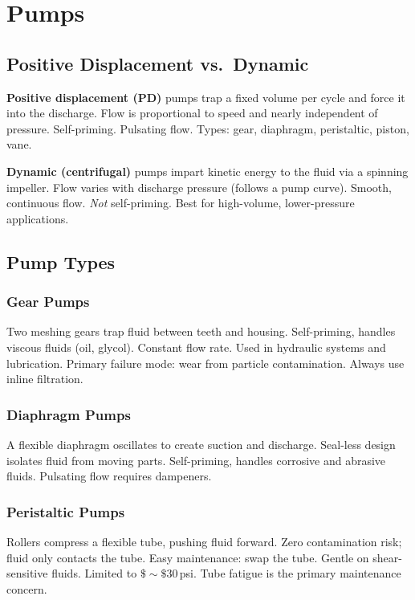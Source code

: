 \documentclass[11pt,letterpaper,twoside,openany]{book}
\begin{document}
\section{Pumps}

\subsection{Positive Displacement vs.\ Dynamic}

\textbf{Positive displacement (PD)} pumps trap a fixed volume per cycle and force it into the discharge. Flow is proportional to speed and nearly independent of pressure. Self-priming. Pulsating flow. Types: gear, diaphragm, peristaltic, piston, vane.

\textbf{Dynamic (centrifugal)} pumps impart kinetic energy to the fluid via a spinning impeller. Flow varies with discharge pressure (follows a pump curve). Smooth, continuous flow. \emph{Not} self-priming. Best for high-volume, lower-pressure applications.

\subsection{Pump Types}

\subsubsection{Gear Pumps}
Two meshing gears trap fluid between teeth and housing. Self-priming, handles viscous fluids (oil, glycol). Constant flow rate. Used in hydraulic systems and lubrication. Primary failure mode: wear from particle contamination. Always use inline filtration.

\subsubsection{Diaphragm Pumps}
A flexible diaphragm oscillates to create suction and discharge. Seal-less design isolates fluid from moving parts. Self-priming, handles corrosive and abrasive fluids. Pulsating flow requires dampeners.

\subsubsection{Peristaltic Pumps}
Rollers compress a flexible tube, pushing fluid forward. Zero contamination risk; fluid only contacts the tube. Easy maintenance: swap the tube. Gentle on shear-sensitive fluids. Limited to $\$\sim\$$30\,psi. Tube fatigue is the primary maintenance concern.
\end{document}

